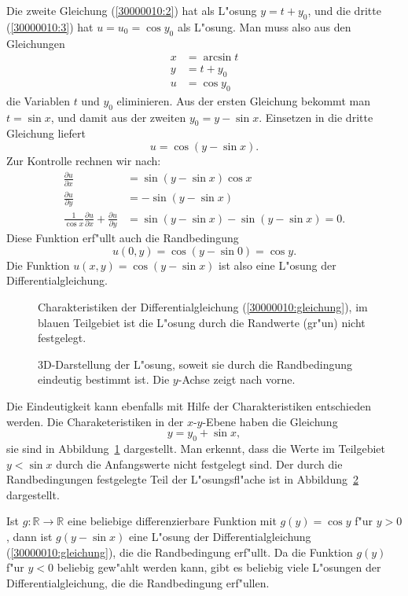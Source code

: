 \begin{loesung}
\begin{teilaufgaben}
Die zweite Gleichung (\ref{30000010:2}) hat als L"osung $y=t+y_0$, und
die dritte (\ref{30000010:3}) hat $u=u_0=\cos y_0$ als L"osung.
Man muss also aus den Gleichungen
\begin{align*}
x&=\arcsin t\\
y&=t+y_0\\
u&=\cos y_0
\end{align*}
die Variablen $t$ und $y_0$ eliminieren.
Aus der ersten Gleichung bekommt man $t=\sin x$, und damit aus der zweiten
$y_0=y-\sin x$. Einsetzen in die dritte Gleichung liefert
\begin{equation}
u=\cos(y-\sin x).
\end{equation}
Zur Kontrolle rechnen wir nach:
\begin{align*}
\frac{\partial u}{\partial x}&=\sin(y-\sin x)\cos x
\\
\frac{\partial u}{\partial y}&=-\sin(y-\sin x)
\\
\frac1{\cos x}\frac{\partial u}{\partial x}+\frac{\partial u}{\partial y}
&=
\sin(y-\sin x)-\sin(y-\sin x)=0.
\end{align*}
Diese Funktion erf"ullt auch die Randbedingung
\begin{equation*}
u(0,y)=\cos(y-\sin 0)=\cos y.
\end{equation*}
Die Funktion $u(x,y)=\cos(y-\sin x)$ ist also eine L"osung der
Differentialgleichung.
\item
\begin{figure}
\centering
{}
\caption{Charakteristiken der Differentialgleichung (\ref{30000010:gleichung}),
im blauen Teilgebiet ist die L"osung durch die Randwerte (gr"un) nicht
festgelegt.
\label{30000010:char}}
\end{figure}
\begin{figure}
\centering
{}
\caption{3D-Darstellung der L"osung, soweit sie durch die Randbedingung
eindeutig bestimmt ist. Die $y$-Achse zeigt nach vorne.
\label{30000010:loesungsflaeche}}
\end{figure}
Die Eindeutigkeit kann ebenfalls mit Hilfe der Charakteristiken entschieden
werden.
Die Charaketeristiken in der $x$-$y$-Ebene haben die Gleichung
\[
y=y_0 + \sin x,
\]
sie sind in Abbildung~\ref{30000010:char} dargestellt.
Man erkennt, dass die Werte im Teilgebiet $y < \sin x$ durch die
Anfangswerte nicht festgelegt sind.
Der durch die Randbedingungen festgelegte Teil der L"osungsfl"ache ist
in Abbildung~\ref{30000010:loesungsflaeche} dargestellt.

Ist $g\colon\mathbb R\to\mathbb R$ eine beliebige differenzierbare Funktion mit
$g(y)=\cos y$ f"ur $y>0$, dann ist $g(y-\sin x)$ eine L"osung der
Differentialgleichung (\ref{30000010:gleichung}), die die Randbedingung
erf"ullt. Da die Funktion $g(y)$ f"ur $y<0$ beliebig gew"ahlt werden
kann, gibt es beliebig viele L"osungen der Differentialgleichung,
die die Randbedingung erf"ullen.
\qedhere
\end{teilaufgaben}
\end{loesung}

